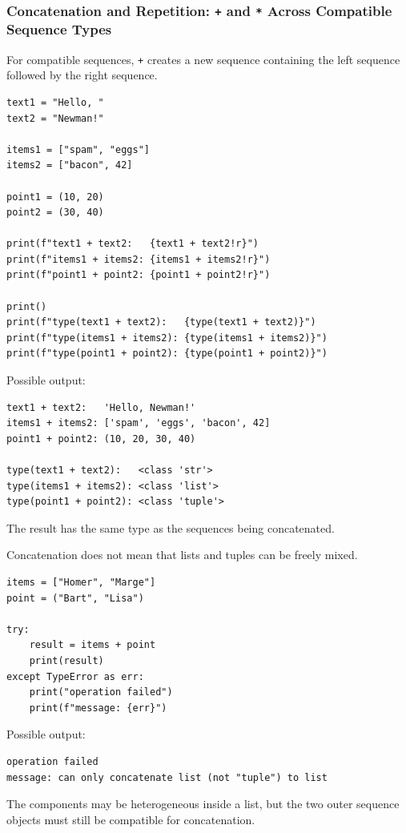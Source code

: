 \subsubsection{Concatenation and Repetition: \texttt{+} and \texttt{*} Across Compatible Sequence Types}

For compatible sequences, \texttt{+} creates a new sequence containing the left sequence followed by the right sequence.

\begin{verbatim}
text1 = "Hello, "
text2 = "Newman!"

items1 = ["spam", "eggs"]
items2 = ["bacon", 42]

point1 = (10, 20)
point2 = (30, 40)

print(f"text1 + text2:   {text1 + text2!r}")
print(f"items1 + items2: {items1 + items2!r}")
print(f"point1 + point2: {point1 + point2!r}")

print()
print(f"type(text1 + text2):   {type(text1 + text2)}")
print(f"type(items1 + items2): {type(items1 + items2)}")
print(f"type(point1 + point2): {type(point1 + point2)}")
\end{verbatim}

Possible output:

\begin{verbatim}
text1 + text2:   'Hello, Newman!'
items1 + items2: ['spam', 'eggs', 'bacon', 42]
point1 + point2: (10, 20, 30, 40)

type(text1 + text2):   <class 'str'>
type(items1 + items2): <class 'list'>
type(point1 + point2): <class 'tuple'>
\end{verbatim}

The result has the same type as the sequences being concatenated.

Concatenation does not mean that lists and tuples can be freely mixed.

\begin{verbatim}
items = ["Homer", "Marge"]
point = ("Bart", "Lisa")

try:
    result = items + point
    print(result)
except TypeError as err:
    print("operation failed")
    print(f"message: {err}")
\end{verbatim}

Possible output:

\begin{verbatim}
operation failed
message: can only concatenate list (not "tuple") to list
\end{verbatim}

The components may be heterogeneous inside a list, but the two outer sequence objects must still be compatible for concatenation.

